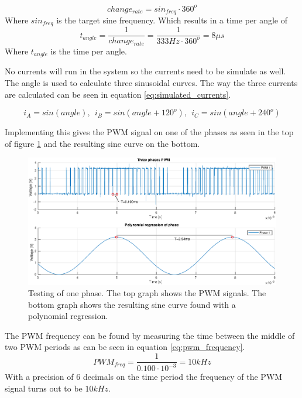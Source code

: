 \begin{equation}
    change_{rate} = sin_{freq} \cdot 360^o
\end{equation}
Where $sin_{freq}$ is the target sine frequency. Which results in a time per angle of
\begin{equation}
    t_{angle} = \frac{1}{change_{rate}} = \frac{1}{333Hz \cdot 360^o} = 8 \mu s
\end{equation}
Where $t_{angle}$ is the time per angle. 

No currents will run in the system so the currents need to be simulate as well. The angle is used to calculate three sinusoidal curves. The way the three currents are calculated can be seen in equation \ref{eq:simulated_currents}.

\begin{equation}
    i_A = sin(angle), \ \ i_B = sin(angle + 120^o), \ \ i_C = sin(angle + 240^o)
    \label{eq:simulated_currents}
\end{equation}


Implementing this gives the PWM signal on one of the phases as seen in the top of figure \ref{fig:one_phase} and the resulting sine curve on the bottom.

\begin{figure}[H]
	\centering
	\includegraphics[width=1 \textwidth]{pictures/software/one_phase.eps}
	\caption{Testing of one phase. The top graph shows the PWM signals. The bottom graph shows the resulting sine curve found with a polynomial regression.}
	\label{fig:one_phase}
\end{figure}

The PWM frequency can be found by measuring the time between the middle of two PWM periods as can be seen in equation \ref{eq:pwm_frequency}. 
\begin{equation}
    PWM_{freq} = \frac{1}{0.100 \cdot 10^{-3}} = 10kHz
    \label{eq:pwm_frequency}
\end{equation}
With a precision of 6 decimals on the time period the frequency of the PWM signal turns out to be $10kHz$.

